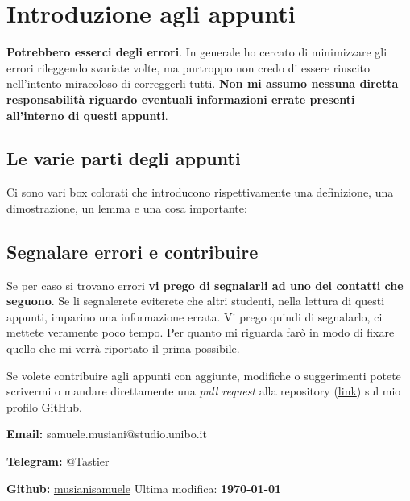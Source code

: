 \section{Introduzione agli appunti}

\textbf{Potrebbero esserci degli errori}. In generale ho cercato di minimizzare 
gli errori rileggendo svariate volte, ma purtroppo non credo di essere riuscito 
nell'intento miracoloso di correggerli tutti. \textbf{Non mi assumo nessuna 
diretta responsabilità riguardo eventuali informazioni errate presenti 
all'interno di questi appunti}.

\subsection{Le varie parti degli appunti}
Ci sono vari box colorati che introducono rispettivamente una definizione, una 
dimostrazione, un lemma e una cosa importante:






\subsection{Segnalare errori e contribuire}
Se per caso si trovano errori \textbf{vi prego di segnalarli ad uno dei 
contatti che seguono}. Se li segnalerete eviterete che altri studenti, nella 
lettura di questi appunti, imparino una informazione errata. Vi prego quindi di 
segnalarlo, ci mettete veramente poco tempo. Per quanto mi riguarda farò in 
modo di fixare quello che mi verrà riportato il prima possibile.\bigbreak

Se volete contribuire agli appunti con aggiunte, modifiche o suggerimenti 
potete scrivermi o mandare direttamente una \textit{pull request} alla 
repository (\href{https://github.com/musianisamuele/Analisi}{link}) sul mio 
profilo GitHub.\bigbreak


\textbf{Email:} samuele.musiani@studio.unibo.it\bigbreak

\textbf{Telegram:} @Tastier\bigbreak

\textbf{Github:} \href{https://github.com/musianisamuele}{musianisamuele}
\vfill\hfill Ultima modifica: \textbf{\today}
